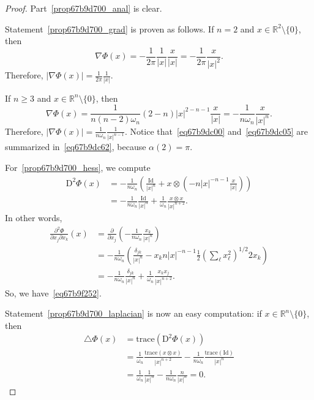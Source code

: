 \documentclass[a4paper,9pt]{amsart}
\newcommand{\R}{\mathbb{R}}	%
\newcommand{\Id}{\mathrm{Id}}	%
\newcommand{\de}{\partial}		%
\newcommand{\Diff}{\mathrm{D}}
\newcommand{\laplacian}{\triangle}
\newcommand{\grad}{\nabla}
\newcommand{\trace}{\mathrm{trace}}
\theoremstyle{plain}
\theoremstyle{definition}
\theoremstyle{remark}
\begin{document}
\begin{proof}
	Part~\ref{prop67b9d700_anal} is clear.
	
	Statement~\ref{prop67b9d700_grad} is proven as follows.
	If $n=2$ and $x\in\R^2\setminus\{0\}$, then
	\begin{equation}\label{eq67b9dc00}
		\grad\Phi(x)
		= -\frac1{2\pi} \frac1{|x|} \frac{x}{|x|} 
		= -\frac1{2\pi} \frac{x}{|x|^2} .
	\end{equation}
	Therefore,
	$|\grad\Phi(x)| = \frac1{2\pi} \frac{1}{|x|}$.
	
	If $n\ge3$ and $x\in\R^n\setminus\{0\}$, then
	\begin{equation}\label{eq67b9dc05}
		\grad\Phi(x)
		= \frac1{n(n-2)\omega_n } (2-n) |x|^{2-n-1} \frac{x}{|x|}
		= - \frac1{n\omega_n } \frac{x}{|x|^n} .
	\end{equation}
	Therefore, $|\grad\Phi(x)| = \frac1{n\omega_n } \frac1{|x|^{n-1}}$.
	Notice that~\eqref{eq67b9dc00} and~\eqref{eq67b9dc05} are summarized in~\eqref{eq67b9dc62}, because $\alpha(2)=\pi$.
	
	For~\ref{prop67b9d700_hess}, we compute
	\begin{align*}
	\Diff^2\Phi(x)
	&= -\frac{1}{n\omega_n } \left( \frac{\Id}{|x|^n} + x\otimes \left( -n|x|^{-n-1} \frac{x}{|x|} \right) \right) \\
	&= - \frac{1}{n\omega_n } \frac{\Id}{|x|^n} + \frac1{\omega_n } \frac{x\otimes x}{|x|^{n+2}} .
	\end{align*}
	In other words,
	\begin{align*}
	\frac{\de^2\Phi}{\de x_j\de x_k}(x)
	&= \frac{\de}{\de x_j} \left( - \frac1{n\omega_n } \frac{x_k}{|x|^n} \right) \\
	&= - \frac1{n\omega_n } \left( \frac{\delta_{jk}}{|x|^n} - x_k n |x|^{-n-1} \frac12 (\sum_\ell x_\ell^2)^{1/2} 2x_k \right) \\
	&= - \frac1{n\omega_n }\frac{\delta_{jk}}{|x|^n} + \frac1{\omega_n } \frac{x_kx_j}{|x|^{n+2}} .
	\end{align*}
	So, we have~\eqref{eq67b9f252}.
	
	Statement~\ref{prop67b9d700_laplacian} is now an easy computation:
	if $x\in\R^n\setminus\{0\}$, then
	\begin{align*}
		\laplacian\Phi(x)  
		&= \trace(\Diff^2\Phi(x)) \\
		&= \frac1{\omega_n } \frac{\trace(x\otimes x)}{|x|^{n+2}} - \frac{1}{n\omega_n } \frac{\trace(\Id)}{|x|^n}  \\
		&= \frac1{\omega_n } \frac{1}{|x|^n} - \frac{1}{n\omega_n } \frac{n}{|x|^n}
		= 0 .
	\end{align*}


\end{proof}
\end{document}
